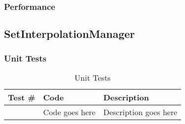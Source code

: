 \documentclass[12pt]{article}
\newcounter{TestCounter}
\begin{document}
	\subsubsection{Performance}
%

\subsection{SetInterpolationManager}
	\subsubsection{Unit Tests}
		\begin{table}[!htbp]
		\centering
		\caption{Unit Tests}\label{_unit}
		\begin{tabular}{lll}
		\toprule
		\bf Test \# & Code & \bf Description\\\midrule
		\stepcounter{TestCounter}\arabic{TestCounter} & Code goes here & Description goes here\\
		\bottomrule
		\end{tabular}
		\end{table}
\end{document}
